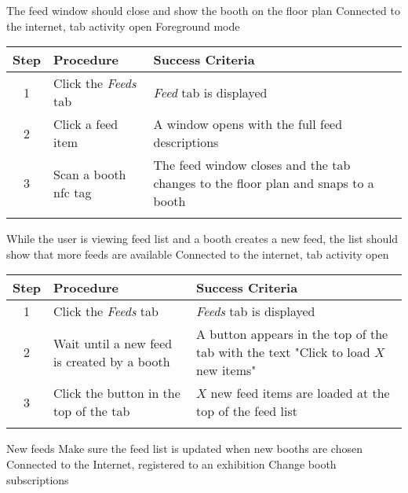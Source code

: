 \testcase
{\casethree}
{The feed window should close and show the booth on the floor plan}
{Connected to the internet, tab activity open}
{Foreground mode}

\begin{center}
\begin{tabular}{| c | p{4.6cm} | p{4.6cm} |}
\hline
\textbf{Step} & \textbf{Procedure} & \textbf{Success Criteria}\\
\hline
1 & Click the \textit{Feeds} tab & \textit{Feed} tab is displayed\\
\hline
2 & Click a feed item & A window opens with the full feed descriptions\\
\hline
3 & Scan a booth \ac{nfc} tag & The feed window closes and the tab changes to the floor plan and snaps to a booth\\
\hline
\multicolumn{3}{c}{} \\%
\end{tabular}
\end{center}

\testcase
{\casefour}
{While the user is viewing feed list and a booth creates a new feed, the list should show that more feeds are available}
{Connected to the internet, tab activity open}
{}

\begin{center}
\begin{tabular}{| c | p{4.6cm} | p{4.6cm} |}
\hline
\textbf{Step} & \textbf{Procedure} & \textbf{Success Criteria}\\
\hline
1 & Click the \textit{Feeds} tab & \textit{Feeds} tab is displayed\\
\hline
2 & Wait until a new feed is created by a booth & A button appears in the top of the tab with the text "Click to load $X$ new items"\\
\hline
3 & Click the button in the top of the tab & $X$ new feed items are loaded at the top of the feed list\\
\hline
\multicolumn{3}{c}{} \\%
\end{tabular}
\end{center}

\newcommand{\casefive}{New feeds}
\newcommand{\casesix}{Register a user}
\newcommand{\caseseven}{Snap to booth}
\newcommand{\caseeight}{Navigate to booth}
\newcommand{\casenine}{Register new exhibition}

\testcase
{\casefive}
{Make sure the feed list is updated when new booths are chosen}
{Connected to the Internet, registered to an exhibition}
{Change booth subscriptions}

